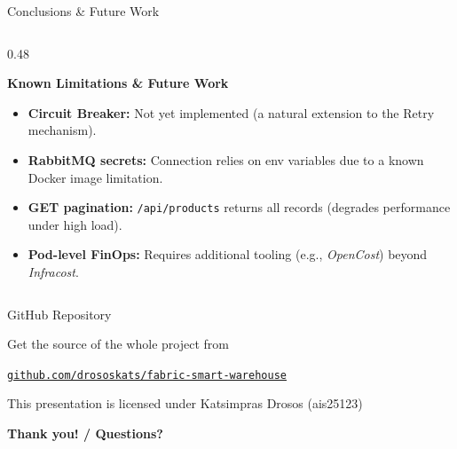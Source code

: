 \begin{frame}{Conclusions \& Future Work}
\begin{columns}[T]
        \begin{column}{0.48\textwidth}
            \begin{tcolorbox}[colback=white, colframe=gray!30, arc=2pt, boxrule=0.5pt]
                \textbf{\textcolor{gray!80!black}{Known Limitations \& Future Work}}\\[0.2cm]
                \scriptsize
                \begin{itemize}
                    \setlength{\itemsep}{6pt}
                    \item \textbf{Circuit Breaker:} Not yet implemented (a natural extension to the Retry mechanism).
                    \item \textbf{RabbitMQ secrets:} Connection relies on env variables due to a known Docker image limitation.
                    \item \textbf{GET pagination:} \texttt{/api/products} returns all records (degrades performance under high load).
                    \item \textcolor{HUAblue}{\textbf{Pod-level FinOps:}} Requires additional tooling (e.g., \textit{OpenCost}) beyond \textit{Infracost}.
                \end{itemize}
            \end{tcolorbox}
        \end{column}
    \end{columns}
 \end{frame}   

\begin{frame}{GitHub Repository}
\begin{center}Get the source of the whole project from\end{center}
\begin{center}\href{https://github.com/drososkats/fabric-smart-warehouse}{\color{HUAblue}\texttt{github.com/drososkats/fabric-smart-warehouse}}\end{center}
\vspace{0.3cm}
\begin{center}\small This presentation is licensed under Katsimpras Drosos (ais25123)\end{center}
\begin{center}\ccbysa\end{center}
\end{frame}

\begin{frame}
    \textbf{Thank you! / Questions?} ~\alert{\faSmile}~
\end{frame}
